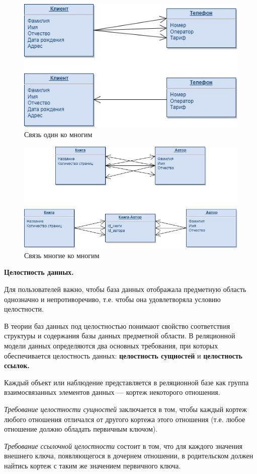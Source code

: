 \begin{figure}[!h]
    \centering
    \includegraphics[scale = 0.5]{1/1kn.jpg}
    \caption{Связь один ко многим}
    \label{fig:onekn}
\end{figure}

\begin{figure}[!h]
    \centering
    \includegraphics[scale = 0.5]{1/nkn.jpg}
    \caption{Связь многие ко многим}
    \label{fig:nkn}
\end{figure}


\textbf{Целостность данных.}

Для пользователей важно, чтобы база данных отображала предметную область однозначно и непротиворечиво, т.е. чтобы она удовлетворяла условию целостности.

В теории баз данных под целостностью понимают свойство соответствия структуры и содержания базы данных предметной области. В реляционной модели данных определяются два основных требования, при которых обеспечивается целостность данных: \textbf{целостность сущностей} и \textbf{целостность ссылок.}

Каждый объект или наблюдение представляется в реляционной базе как группа взаимосвязанных элементов данных — кортеж некоторого отношения.

\textit{Требование целостности сущностей} заключается в том, чтобы каждый кортеж любого отношения отличался от другого кортежа этого отношения (т.е. любое отношение должно обладать первичным ключом).

\textit{Требование ссылочной целостности} состоит в том, что для каждого значения внешнего ключа, появляющегося в дочернем отношении, в родительском должен найтись кортеж с таким же значением первичного ключа.
